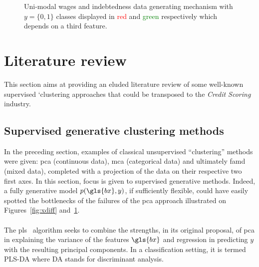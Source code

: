 \begin{figure}
\caption{\label{fig:ydiff} Uni-modal wages and indebtedness data generating mechanism with $y = \{0,1\}$ classes displayed in \textcolor{red}{red} and \textcolor{green}{green} respectively which depends on a third feature.}
\end{figure}








\section{Literature review} \label{sec:literature}

This section aims at providing an eluded literature review of some well-known supervised `clustering approaches that could be transposed to the \textit{Credit Scoring} industry.

\subsection{Supervised generative clustering methods} \label{subsec:sup_gen}

In the preceding section, examples of classical unsupervised ``clustering'' methods were given: \gls{pca} (continuous data), \gls{mca} (categorical data) and ultimately \gls{famd} (mixed data), completed with a projection of the data on their respective two first axes. In this section, focus is given to supervised generative methods. Indeed, a fully generative model $p(\gls{bx},y)$, if sufficiently flexible, could have easily spotted the bottlenecks of the failures of the \gls{pca} approach illustrated on Figures~\ref{fig:xdiff} and~\ref{fig:ydiff}.

\paragraph{}

The \gls{pls}~\cite{wold1984collinearity} algorithm seeks to combine the strengths, in its original proposal, of \gls{pca} in explaining the variance of the features $\gls{bx}$ and regression in predicting $y$ with the resulting principal components. In a classification setting, it is termed PLS-DA where DA stands for discriminant analysis.

